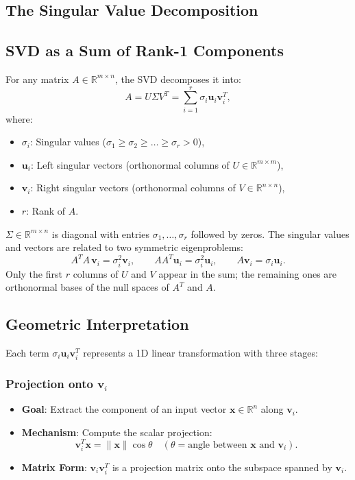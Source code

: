 \begin{notechapter}
\chapter{The Singular Value Decomposition}\label{ch:svd}

\section{SVD as a Sum of Rank-1 Components}
For any matrix \( A \in \mathbb{R}^{m \times n} \), the SVD decomposes it into:
\[
A = U \Sigma V^T = \sum_{i=1}^r \sigma_i \mathbf{u}_i \mathbf{v}_i^T,
\]
where:
\begin{itemize}
    \item \( \sigma_i \): Singular values (\( \sigma_1 \geq \sigma_2 \geq \dots \geq \sigma_r > 0 \)),
    \item \( \mathbf{u}_i \): Left singular vectors (orthonormal columns of \( U \in \mathbb{R}^{m \times m} \)),
    \item \( \mathbf{v}_i \): Right singular vectors (orthonormal columns of \( V \in \mathbb{R}^{n \times n} \)),
        \item \( r \): Rank of \( A \).
\end{itemize}
\( \Sigma \in \mathbb{R}^{m \times n} \) is diagonal with entries \( \sigma_1, \dots, \sigma_r \) followed by zeros. The singular values and vectors are related to two symmetric eigenproblems:
\[
A^T A\, \mathbf{v}_i = \sigma_i^2 \mathbf{v}_i, \qquad A A^T \mathbf{u}_i = \sigma_i^2 \mathbf{u}_i, \qquad A \mathbf{v}_i = \sigma_i \mathbf{u}_i .
\]
Only the first \( r \) columns of \( U \) and \( V \) appear in the sum; the remaining ones are orthonormal bases of the null spaces of \( A^T \) and \( A \).

\section{Geometric Interpretation}
Each term \( \sigma_i \mathbf{u}_i \mathbf{v}_i^T \) represents a 1D linear transformation with three stages:

\subsection{Projection onto \( \mathbf{v}_i \)} 
\begin{itemize}
    \item \textbf{Goal}: Extract the component of an input vector \( \mathbf{x} \in \mathbb{R}^n \) along \( \mathbf{v}_i \).
    \item \textbf{Mechanism}: Compute the scalar projection:
    \[
    \mathbf{v}_i^T \mathbf{x} = \|\mathbf{x}\| \cos\theta \quad (\theta = \text{angle between } \mathbf{x} \text{ and } \mathbf{v}_i).
    \]
    \item \textbf{Matrix Form}: \( \mathbf{v}_i \mathbf{v}_i^T \) is a projection matrix onto the subspace spanned by \( \mathbf{v}_i \).
\end{itemize}


\end{notechapter}
